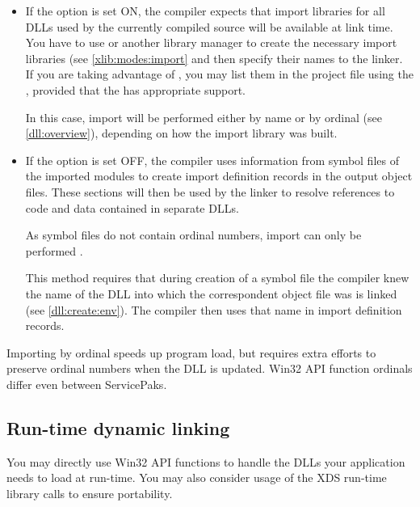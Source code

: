 \begin{itemize}
\item If the  option is set ON, the compiler expects that
      import libraries for all DLLs used by the currently compiled source
      will be available at link time. You have to use 
      or another library manager to create the necessary import libraries
      (see \ref{xlib:modes:import} and then specify their names to the linker.
      If you are taking advantage of
      ,
      you may list them in the project file using the
      , provided that
      the  has appropriate support.

      In this case, import will be performed either
      by name or by ordinal (see \ref{dll:overview}),
      depending on how the import library was built.

\item If the  option is set OFF, the compiler uses information
      from symbol files of the imported modules to create import definition
      records in the output object files.
      These sections will then be used by the linker to resolve references to
      code and data contained in separate DLLs.

      As symbol files do not contain ordinal numbers,
      import can only be performed .

      This method requires that during creation of a symbol file the
      compiler knew the name of the DLL into which
      the correspondent object file was is linked (see \ref{dll:create:env}).
      The compiler then uses that name in import definition records.
\end{itemize}

Importing by ordinal speeds up program load,
but requires extra efforts to preserve ordinal numbers when the DLL is updated.
Win32 API function ordinals differ even between ServicePaks.

\subsection{Run-time dynamic linking}
\label{dll:using:run-time}

You may directly use Win32 API functions to handle the
DLLs your application needs to load at run-time. You may also consider
usage of the XDS run-time library calls to ensure portability.

